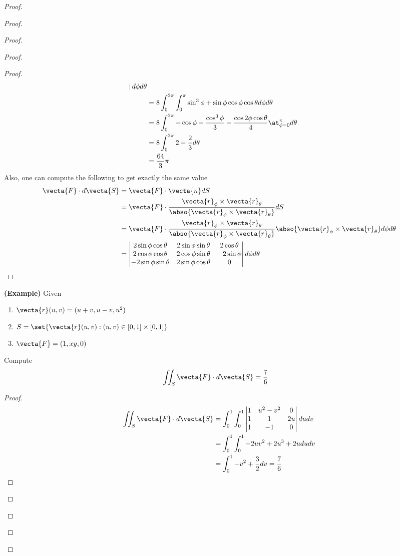 \documentclass{report}
\begin{document}
\begin{proof}
\begin{proof}
\begin{proof}
\begin{proof}
\begin{proof}
\begin{align*}
\begin{vmatrix}
\end{vmatrix} d\phi d\theta \\
&=8\int_0^{2\pi}\int_0^{\pi} \sin^3 \phi +\sin \phi \cos \phi \cos \theta d\phi d\theta \\
&=8\int_0^{2\pi } -\cos \phi+\frac{\cos^3 \phi}{3}-\frac{\cos 2\phi \cos \theta}{4}\at_{\phi=0}^\pi d\theta\\
&=8\int_0^{2\pi} 2-\frac{2}{3} d\theta \\
&=\frac{64}{3}\pi
\end{align*}
Also, one can compute the following to get exactly the same value 
\begin{align*}
\vecta{F}\cdot d\vecta{S}&=\vecta{F}\cdot \vecta{n}dS\\
&=\vecta{F}\cdot \frac{\vecta{r}_{\phi}\times \vecta{r}_{\theta}}{\abso{\vecta{r}_{\phi}\times \vecta{r}_{\theta}}} dS\\
&=\vecta{F}\cdot \frac{\vecta{r}_\phi\times \vecta{r}_\theta }{\abso{\vecta{r}_\phi \times \vecta{r}_\theta}} \abso{\vecta{r}_\phi \times \vecta{r}_\theta }d\phi d\theta \\
&=\begin{vmatrix} 
  2\sin \phi \cos \theta& 2\sin \phi \sin \theta& 2\cos \theta\\
  2\cos \phi \cos \theta & 2\cos \phi \sin \theta & -2\sin \phi\\
  -2\sin \phi \sin \theta & 2\sin \phi \cos \theta &0 
\end{vmatrix} d\phi d\theta 
\end{align*}
\end{proof}
\begin{theorem}
\label{10.1.12}
\textbf{(Example)} Given 
\begin{enumerate}[label=(\alph*)]
  \item $\vecta{r}(u,v)=(u+v,u-v,u^2)$ 
  \item $S=\set{\vecta{r}(u,v):(u,v)\in [0,1]\times [0,1]}$ 
  \item $\vecta{F}=(1,xy,0)$
\end{enumerate}
Compute 
\begin{align*}
\iint_S \vecta{F}\cdot d\vecta{S}&=\frac{7}{6}
\end{align*}
\end{theorem}
\begin{proof}
\begin{align*}
\iint_S \vecta{F}\cdot d\vecta{S}&=\int_0^1 \int_0^1 \begin{vmatrix} 
  1 & u^2-v^2 & 0\\
  1 & 1 & 2u \\
  1 & -1 & 0
\end{vmatrix}dudv\\
&=\int_0^1 \int_0^1 -2uv^2+2u^3+2u dudv\\
&=\int_0^1 -v^2+\frac{3}{2}dv=\frac{7}{6}
\end{align*}
\end{proof}

\end{proof}
\end{proof}
\end{proof}
\end{proof}
\end{document}
